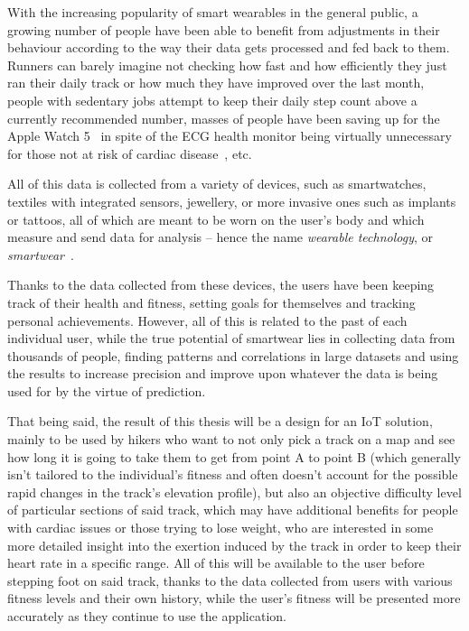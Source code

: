 With the increasing popularity of smart wearables in the general public, a growing number of people have been able to benefit from adjustments in their behaviour according to the way their data gets processed and fed back to them.
Runners can barely imagine not checking how fast and how efficiently they just ran their daily track or how much they have improved over the last month,
people with sedentary jobs attempt to keep their daily step count above a currently recommended number,
masses of people have been saving up for the Apple Watch 5~\cite{AppleWatch5} in spite of the ECG health monitor being virtually unnecessary for those not at risk of cardiac disease~\cite{ecg-screening}, etc.

All of this data is collected from a variety of devices, such as smartwatches, textiles with integrated sensors, jewellery, or more invasive ones such as implants or tattoos, all of which are meant to be worn on the user's body and which measure and send data for analysis -- hence the name \textit{wearable technology}, or \textit{smartwear}~\cite{what-is-wearable-tech}.

Thanks to the data collected from these devices, the users have been keeping track of their health and fitness, setting goals for themselves and tracking personal achievements.
However, all of this is related to the past of each individual user, while the true potential of smartwear lies in collecting data from thousands of people,
finding patterns and correlations in large datasets and using the results to increase precision and improve upon whatever the data is being used for by the virtue of prediction.

That being said, the result of this thesis will be a design for an IoT solution, mainly to be used by hikers who want to not only pick a track on a map and see how long it is going to take them to get from point A to point B (which generally isn't tailored to the individual's fitness and often doesn't account for the possible rapid changes in the track's elevation profile),
but also an objective difficulty level of particular sections of said track, which may have additional benefits for people with cardiac issues or those trying to lose weight, who are interested in some more detailed insight into the exertion induced by the track in order to keep their heart rate in a specific range.
All of this will be available to the user before stepping foot on said track, thanks to the data collected from users with various fitness levels and their own history,
while the user's fitness will be presented more accurately as they continue to use the application.

